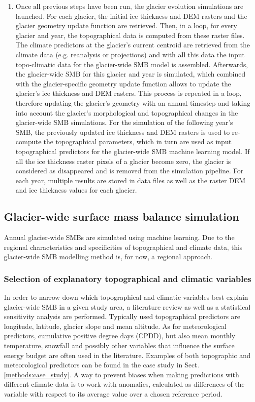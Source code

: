 \begin{enumerate}
\item Once all previous steps have been run, the glacier evolution simulations are launched. For each glacier, the initial ice thickness and DEM rasters and the glacier geometry update function are retrieved. Then, in a loop, for every glacier and year, the topographical data is computed from these raster files. The climate predictors at the glacier’s current centroid are retrieved from the climate data (e.g. reanalysis or projections) and with all this data the input topo-climatic data for the glacier-wide SMB model is assembled. Afterwards, the glacier-wide SMB for this glacier and year is simulated, which combined with the glacier-specific geometry update function allows to update the glacier’s ice thickness and DEM rasters. This process is repeated in a loop, therefore updating the glacier’s geometry with an annual timestep and taking into account the glacier’s morphological and topographical changes in the glacier-wide SMB simulations. For the simulation of the following year’s SMB, the previously updated ice thickness and DEM rasters is used to re-compute the topographical parameters, which in turn are used as input topographical predictors for the glacier-wide SMB machine learning model.  If all the ice thickness raster pixels of a glacier become zero, the glacier is considered as disappeared and is removed from the simulation pipeline. For each year, multiple results are stored in data files as well as the raster DEM and ice thickness values for each glacier. 
\end{enumerate}

\subsection{Glacier-wide surface mass balance simulation} \label{methods:methods:SMB}
Annual glacier-wide SMBs are simulated using machine learning. Due to the regional characteristics and specificities of topographical and climate data, this glacier-wide SMB modelling method is, for now, a regional approach.

\subsubsection{Selection of explanatory topographical and climatic variables} 

In order to narrow down which topographical and climatic variables best explain glacier-wide SMB in a given study area, a literature review as well as a statistical sensitivity analysis are performed. Typically used topographical predictors are longitude, latitude, glacier slope and mean altitude. As for meteorological predictors, cumulative positive degree days (CPDD), but also mean monthly temperature, snowfall and possibly other variables that influence the surface energy budget are often used in the literature. Examples of both topographic and meteorological predictors can be found in the case study in Sect. \ref{methods:case_study}. A way to prevent biases when making predictions with different climate data is to work with anomalies, calculated as differences of the variable with respect to its average value over a chosen reference period. 

